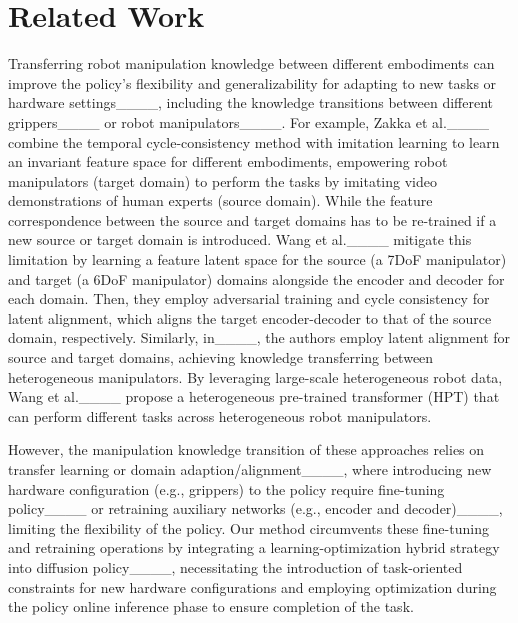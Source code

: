 \section{Related Work}
Transferring robot manipulation knowledge between different embodiments can improve the policy's flexibility and generalizability for adapting to new tasks or hardware settings____, including the knowledge transitions between different grippers____ or robot manipulators____. For example, Zakka et al.____ combine the temporal cycle-consistency method with imitation learning to learn an invariant feature space for different embodiments, empowering robot manipulators (target domain) to perform the tasks by imitating video demonstrations of human experts (source domain). While the feature correspondence between the source and target domains has to be re-trained if a new source or target domain is introduced. Wang et al.____ mitigate this limitation by learning a feature latent space for the source (a 7DoF manipulator) and target (a 6DoF manipulator) domains alongside the encoder and decoder for each domain. Then, they employ adversarial training and cycle consistency for latent alignment, which aligns the target encoder-decoder to that of the source domain, respectively. Similarly, in____, the authors employ latent alignment for source and target domains, achieving knowledge transferring between heterogeneous manipulators. By leveraging large-scale heterogeneous robot data, Wang et al.____ propose a heterogeneous pre-trained transformer (HPT) that can perform different tasks across heterogeneous robot manipulators. 

However, the manipulation knowledge transition of these approaches relies on transfer learning or domain adaption/alignment____, where introducing new hardware configuration (e.g., grippers) to the policy require fine-tuning policy____ or retraining auxiliary networks (e.g., encoder and decoder)____, limiting the flexibility of the policy. Our method circumvents these fine-tuning and retraining operations by integrating a learning-optimization hybrid strategy into diffusion policy____, necessitating the introduction of task-oriented constraints for new hardware configurations and employing optimization during the policy online inference phase to ensure completion of the task.

